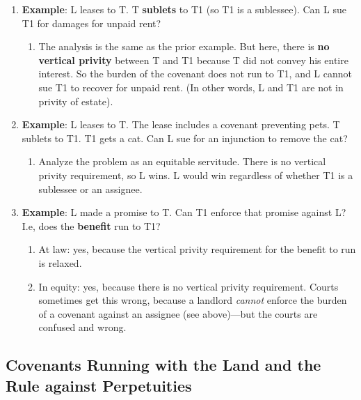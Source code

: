 \begin{enumerate}
\begin{enumerate}
    \end{enumerate}
    \item \textbf{Example}: L leases to T. T \textbf{sublets} to T1 (so T1 is 
    a sublessee). Can L sue T1 for damages for unpaid rent?
    \begin{enumerate}
        \item The analysis is the same as the prior example. But here, there 
        is \textbf{no vertical privity} between T and T1 because T did not 
        convey his entire interest. So the burden of the covenant does not run 
        to T1, and L cannot sue T1 to recover for unpaid rent. (In other 
        words, L and T1 are not in privity of estate).
    \end{enumerate}
    \item \textbf{Example}: L leases to T. The lease includes a covenant 
    preventing pets. T sublets to T1. T1 gets a cat. Can L sue for an 
    injunction to remove the cat?
    \begin{enumerate}
        \item Analyze the problem as an equitable servitude. There is no 
        vertical privity requirement, so L wins. L would win regardless of 
        whether T1 is a sublessee or an assignee.
    \end{enumerate}
    \item \textbf{Example}: L made a promise to T. Can T1 enforce that promise 
    against L? I.e, does the \textbf{benefit} run to T1?
    \begin{enumerate}
        \item At law: yes, because the vertical privity requirement for the 
        benefit to run is relaxed.
        \item In equity: yes, because there is no vertical privity 
        requirement. Courts sometimes get this wrong, because a landlord 
        \emph{cannot} enforce the burden of a covenant against an assignee 
        (see above)---but the courts are confused and wrong.
    \end{enumerate}
\end{enumerate}

\subsection{Covenants Running with the Land and the Rule against Perpetuities}

